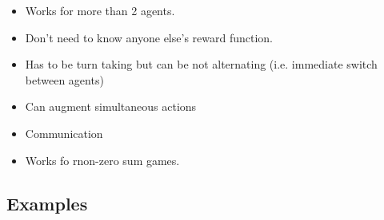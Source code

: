 \begin{warning}
    \begin{itemize}
        \item Works for more than 2 agents. 
        \item Don't need to know anyone else's reward function. 
        \item Has to be turn taking but can be not alternating (i.e. immediate switch between agents)
        \item Can augment simultaneous actions 
        \item Communication 
        \item Works fo rnon-zero sum games. 
    \end{itemize}
\end{warning}
\newpage



\subsection{Examples}
